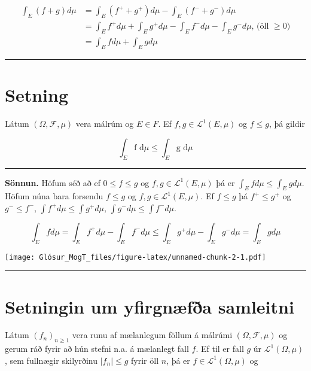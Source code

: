 \documentclass[]{book}
\begin{document}
\[
\begin{aligned}
\int_E(f+g)d\mu &= \int_E (f^++g^+)d\mu - \int_E(f^-+g^-)d\mu \\
&= \int_Ef^+d\mu + \int_Eg^+d\mu - \int_Ef^-d\mu - \int_Eg^-d\mu \text{,   (öll } \geq 0) \\
&= \int_E fd\mu + \int_Egd\mu
\end{aligned}
\]

\begin{center}\rule{0.5\linewidth}{\linethickness}\end{center}

\hypertarget{setning-52}{%
\section{Setning}\label{setning-52}}

Látum \((\Omega, \mathcal F, \mu)\) vera málrúm og \(E\in F\). Ef \(f,g\in \mathcal L^1(E,\mu)\) og \(f\leq g\), þá gildir

\[
\int_E \text{f d}\mu \leq \int_E \text{g d}\mu
\]

\begin{center}\rule{0.5\linewidth}{\linethickness}\end{center}

\textbf{Sönnun.} Höfum séð að ef \(0\leq f\leq g\) og \(f,g\in\mathcal L^1(E,\mu)\) þá er \(\int_Efd\mu \leq \int_Egd\mu\). Höfum núna bara forsendu \(f\leq g\) og \(f,g\in\mathcal L^1(E,\mu)\). Ef \(f\leq g\) þá \(f^+\leq g^+\) og \(g^-\leq f^-\), \(\int f^+d\mu \leq \int g^+ d\mu\), \(\int g^-d\mu \leq \int f^-d\mu\).

\[
\int_Efd\mu = \int_Ef^+d\mu - \int_Ef^-d\mu \leq \int_Eg^+d\mu - \int_Eg^-d\mu = \int_Egd\mu
\]

\texttt{[image: Glósur\_MogT\_files/figure-latex/unnamed-chunk-2-1.pdf]}

\begin{center}\rule{0.5\linewidth}{\linethickness}\end{center}

\hypertarget{setningin-um-yfirgnfa-samleitni}{%
\section{Setningin um yfirgnæfða samleitni}\label{setningin-um-yfirgnfa-samleitni}}

Látum \((f_n)_{n\geq1}\) vera runu af mælanlegum föllum á málrúmi \((\Omega, \mathcal F, \mu)\) og gerum ráð fyrir að hún stefni n.a. á mælanlegt fall \(f\). Ef til er fall \(g\) úr \(\mathcal L^1(\Omega,\mu)\), sem fullnægir skilyrðinu \(|f_n|\leq g\) fyrir öll \(n\), þá er \(f\in\mathcal L^1(\Omega,\mu)\) og
\end{document}
